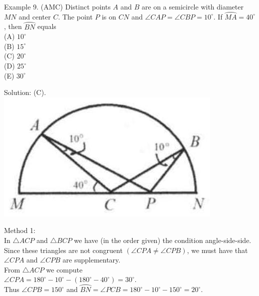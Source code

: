 \documentclass[10pt]{article}
\begin{document}
Example 9. (AMC) Distinct points \(A\) and \(B\) are on a semicircle with diameter \(M N\) and center \(C\). The point \(P\) is on \(C N\) and \(\angle C A P=\angle C B P=10^{\circ}\). If \(\wideparen{M A}=40^{\circ}\), then \(\wideparen{B N}\) equals\\
(A) \(10^{\circ}\)\\
(B) \(15^{\circ}\)\\
(C) \(20^{\circ}\)\\
(D) \(25^{\circ}\)\\
(E) \(30^{\circ}\)

Solution: (C).\\
\includegraphics[max width=\textwidth, center]{2025_04_17_97bc1f7e44d93c271a88g-203(2)}

Method 1:\\
In \(\triangle A C P\) and \(\triangle B C P\) we have (in the order given) the condition angle-side-side.\\
Since these triangles are not congruent \((\angle C P A \neq \angle C P B)\), we must have that \(\angle C P A\) and \(\angle C P B\) are supplementary.\\
From \(\triangle A C P\) we compute\\
\(\angle C P A=180^{\circ}-10^{\circ}-\left(180^{\circ}-40^{\circ}\right)=30^{\circ}\).\\
Thus \(\angle C P B=150^{\circ}\) and \(\wideparen{B N}=\angle P C B=180^{\circ}-10^{\circ}-150^{\circ}=20^{\circ}\).
\end{document}
